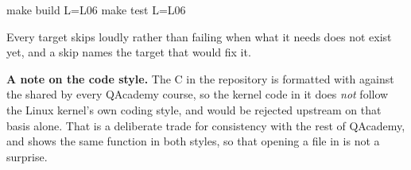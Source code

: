 \begin{shell}
make build L=L06
make test L=L06
\end{shell}

\noindent Every target skips loudly rather than failing when what it needs does not exist yet, and
a skip names the target that would fix it.

\textbf{A note on the code style.} The C in the repository is formatted with 
against the  shared by every QAcademy course, so the kernel code in it does
\emph{not} follow the Linux kernel's own coding style, and would be rejected upstream on that basis
alone. That is a deliberate trade for consistency with the rest of QAcademy, and
 shows the same function in both styles, so that opening a file in
 is not a surprise.
